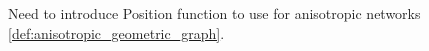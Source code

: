 Need to introduce Position function to use for anisotropic networks
\ref{def:anisotropic_geometric_graph}.





% 






